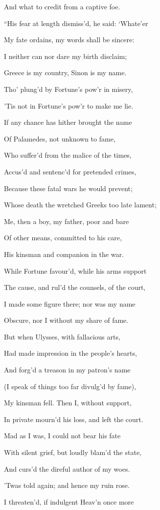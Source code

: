 And what to credit from a captive foe.

“His fear at length dismiss’d, he said: ‘Whate’er

My fate ordains, my words shall be sincere:

I neither can nor dare my birth disclaim;

Greece is my country, Sinon is my name.

Tho’ plung’d by Fortune’s pow’r in misery,

’Tis not in Fortune’s pow’r to make me lie.

If any chance has hither brought the name

Of Palamedes, not unknown to fame,

Who suffer’d from the malice of the times,

Accus’d and sentenc’d for pretended crimes,

Because these fatal wars he would prevent;

Whose death the wretched Greeks too late lament;

Me, then a boy, my father, poor and bare

Of other means, committed to his care,

His kinsman and companion in the war.

While Fortune favour’d, while his arms support

The cause, and rul’d the counsels, of the court,

I made some figure there; nor was my name

Obscure, nor I without my share of fame.

But when Ulysses, with fallacious arts,

Had made impression in the people’s hearts,

And forg’d a treason in my patron’s name

(I speak of things too far divulg’d by fame),

My kinsman fell. Then I, without support,

In private mourn’d his loss, and left the court.

Mad as I was, I could not bear his fate

With silent grief, but loudly blam’d the state,

And curs’d the direful author of my woes.

’Twas told again; and hence my ruin rose.

I threaten’d, if indulgent Heav’n once more

